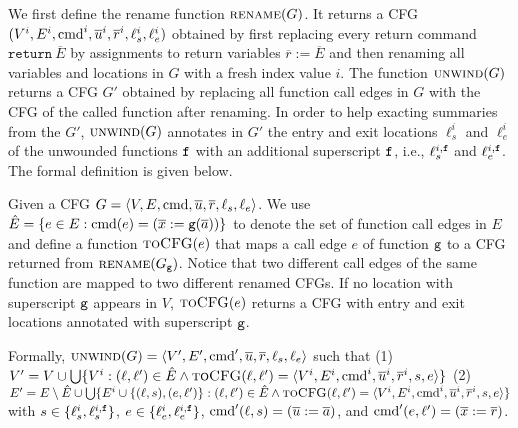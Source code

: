 We first define the rename function $\textsc{rename}(G)$. It returns a CFG $(V^i, E^i,\textmd{cmd}^i, \overline{u}^i, \overline{r}^i,\ell_s^i,\ell_e^i)$ obtained by first replacing every return command $\mathtt{return}\ \overline{E}$ by assignments to return variables $\overline{r} := \overline{E}$ and then renaming all variables and locations in $G$ with a fresh index value $i$. The function $\textsc{unwind}(G)$ returns a CFG $G'$ obtained by replacing all function call edges in $G$ with the CFG of the called function after renaming. In order to help exacting summaries from the $G'$, $\textsc{unwind}(G)$ annotates in $G'$ the entry and exit locations ${\ell_s^i}$ and ${\ell_e^i}$ of the unwounded functions $\mathtt{{f}}$ with an additional superscript $\mathtt{{f}}$, i.e., $\ell_s^{i,\mathtt{{f}}}$ and $\ell_e^{i,\mathtt{{f}}}$. The formal definition is given below.

Given a CFG $G=\langle
V, E,\textmd{cmd}, \overline{u}, \overline{r},{\ell_s},{\ell_e} \rangle$.
We use $\hat{E} =\{e\in E: \textmd{cmd} (e)= (\overline{x}:=\mathtt{g}(\overline{a}))\}$ to denote the set of function call edges in $E$ and define a function $\textsc{toCFG}(e)$ that maps a call edge $e$ of function $\mathtt{{g}}$ to a CFG returned from $\textsc{rename}(G_{\mathtt{{g}}})$. Notice that two different call edges of the same function are mapped to two different renamed CFGs. If no location with superscript $\mathtt{{g}}$ appears in $V$, $\textsc{toCFG}(e)$ returns a CFG with entry and exit locations annotated with superscript $\mathtt{{g}}$.

Formally, $\textsc{unwind}(G) = \langle V', E',\textmd{cmd}', \overline{u}, \overline{r},{\ell_s},{\ell_e} \rangle$ such that (1) $V' = V\cup \bigcup\{V^i:(\ell, \ell')\in \hat{E} \wedge \textsc{toCFG}(\ell, \ell')= \langle V^i, E^i,\textmd{cmd}^i, \overline{u}^i, \overline{r}^i,s,e\rangle \}$ (2) $E'= E \setminus \hat{E} \cup \bigcup\{E^i\cup\{(\ell, s),(e, \ell')\}: (\ell, \ell')\in \hat{E} \wedge \textsc{toCFG}(\ell, \ell')= \langle V^i, E^i,\textmd{cmd}^i, \overline{u}^i, \overline{r}^i,s,e\rangle \}$ with $s\in \{\ell_s^i,\ell_s^{i,\mathtt{{f}}}\}$, $e\in \{\ell_e^i,\ell_e^{i,\mathtt{{f}}}\}$, $\textmd{cmd}' (\ell, s) = (\overline{u}:=\overline{a})$, and $\textmd{cmd}' (e, \ell') = (\overline{x}:=\overline{r})$.



